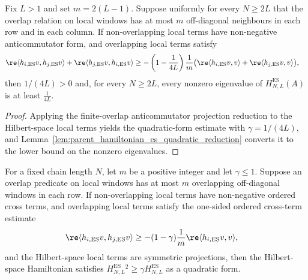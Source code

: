 \begin{lemma}
    \label{lem:parent_hamiltonian_finite_overlap_anticommutator_gap}
    \leanok
    Fix $L>1$ and set $m=2(L-1)$. Suppose uniformly for every $N\ge2L$ that
    the overlap relation on local windows has at most $m$ off-diagonal
    neighbours in each row and in each column. If non-overlapping local terms
    have non-negative anticommutator form, and overlapping local terms satisfy
    \begin{align}
        \re\langle h_{i,\mathrm{ES}}v,h_{j,\mathrm{ES}}v\rangle
        +\re\langle h_{j,\mathrm{ES}}v,h_{i,\mathrm{ES}}v\rangle
         & \ge
        -\left(1-\frac{1}{4L}\right)\frac{1}{m}
        \bigl(    \re\langle h_{i,\mathrm{ES}}v,v\rangle
        +\re\langle h_{j,\mathrm{ES}}v,v\rangle
        \bigr),
        \notag
    \end{align}
    then $1/(4L)>0$ and, for every $N\ge2L$, every nonzero eigenvalue of
    $H_{N,L}^{\mathrm{ES}}(A)$ is at least $\frac{1}{4L}$.
\end{lemma}

\begin{proof}
    \leanok
    Applying the finite-overlap anticommutator projection reduction to the
    Hilbert-space local terms yields the quadratic-form estimate with
    $\gamma=1/(4L)$, and
    Lemma~\ref{lem:parent_hamiltonian_es_quadratic_reduction} converts it to the
    lower bound on the nonzero eigenvalues.
\end{proof}

\begin{lemma}
    \label{lem:parent_hamiltonian_finite_overlap_ordered_cross_term_quadratic}
    \leanok
    For a fixed chain length $N$, let $m$ be a positive integer and let
    $\gamma\le1$. Suppose an overlap predicate on local windows has at most $m$
    overlapping off-diagonal windows in each row. If non-overlapping local terms
    have non-negative ordered cross terms, and overlapping local terms satisfy
    the one-sided ordered cross-term estimate
    \begin{align}
        \re\langle h_{i,\mathrm{ES}}v,h_{j,\mathrm{ES}}v\rangle
         & \ge -(1-\gamma)\frac{1}{m}
        \re\langle h_{i,\mathrm{ES}}v,v\rangle,
        \notag
    \end{align}
    and the Hilbert-space local terms are symmetric projections, then the
    Hilbert-space Hamiltonian satisfies
    $H_{N,L}^{\mathrm{ES}}{}^2\ge\gamma H_{N,L}^{\mathrm{ES}}$ as a quadratic
    form.
\end{lemma}

